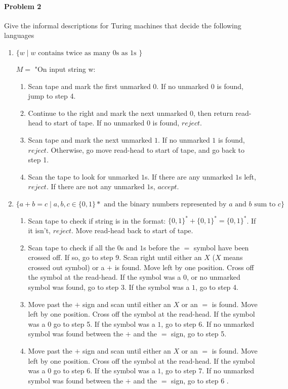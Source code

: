 \documentclass{article}
\begin{document}
\paragraph{Problem 2}
Give the informal descriptions for Turing machines that decide the following languages
\begin{enumerate}[\indent a)]
    \item $\{w \;|\; w \text{ contains twice as many 0s as 1s }\}$
    
	$M = $ "On input string w:
	\begin{enumerate}[\indent 1.]
		\item Scan tape and mark the first unmarked $0$. If no unmarked $0$ is found, jump to step 4.
		\item Continue to the right and mark the next unmarked $0$, then return read-head to start of tape. If no unmarked $0$ is found, $reject$.
		\item Scan tape and mark the next unmarked $1$. If no unmarked $1$ is found, $reject$. Otherwise, go move read-head to start of tape, and go back to step 1.
		\item Scan the tape to look for unmarked $1$s. If there are any unmarked $1$s left, $reject$. If there are not any unmarked $1$s, $accept$.	
    \end{enumerate}


    \item $\{a+b=c \;|\; a,b,c \in \{0,1\}* \text{ and the binary numbers represented by $a$ 
    and $b$ sum to $c$} \}$
    
    \begin{enumerate}[\indent 1.]
		\item Scan tape to check if string is in the format: $\{0,1\}^* + \{0,1\}^* = \{0,1\}^* $. If it isn't, $reject$. Move read-head back to start of tape.
		\item Scan tape to check if all the $0$s and $1$s  before the $=$ symbol have been crossed off. If so, go to step 9. Scan right until either an $X$ ($X$ means crossed out symbol) or a $+$ is found. Move left by one position. Cross off the symbol at the read-head. If the symbol was a $0$, or no unmarked symbol was found, go to step 3. If the symbol was a $1$, go to step 4.
		
		
		\item Move past the $+$ sign and scan until either an $X$ or an $=$ is found. Move left by one position. Cross off the symbol at the read-head. If the symbol was a $0$ go to step 5. If the symbol was a $1$, go to step 6. If no unmarked symbol was found between the $+$ and the $=$ sign, go to step 5.
		\item Move past the $+$ sign and scan until either an $X$ or an $=$ is found. Move left by one position. Cross off the symbol at the read-head. If the symbol was a $0$ go to step 6. If the symbol was a $1$, go to step 7. If no unmarked symbol was found between the $+$ and the $=$ sign, go to step 6 .
		

\end{enumerate}
\end{enumerate}
\end{document}

